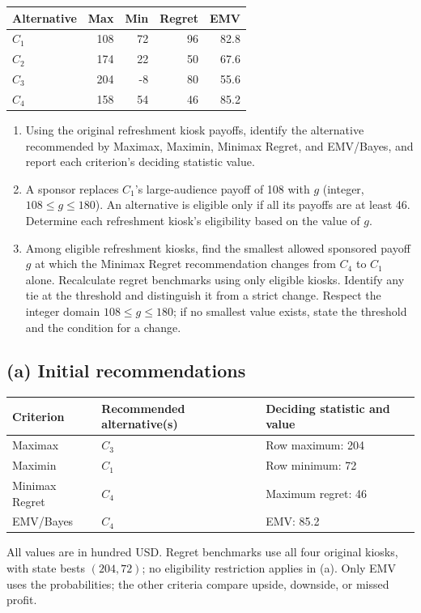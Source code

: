 \begin{center}\small\setlength{\tabcolsep}{4pt}
	\begin{tabular}{lrrrr}\toprule
		Alternative & Max & Min & Regret & EMV\\ \midrule
				$C_1$ & 108 & 72 & 96 & 82.8\\
		$C_2$ & 174 & 22 & 50 & 67.6\\
		$C_3$ & 204 & -8 & 80 & 55.6\\
		$C_4$ & 158 & 54 & 46 & 85.2\\
		\bottomrule
	\end{tabular}
\end{center}

\begin{enumerate}[label=\textbf{(\alph*)},leftmargin=*]
	\item Using the original refreshment kiosk payoffs, identify the alternative recommended by Maximax, Maximin, Minimax Regret, and EMV/Bayes, and report each criterion's deciding statistic value. 

	\item A sponsor replaces $C_1$'s large-audience payoff of 108 with $g$ (integer, $108\leq g\leq180$). An alternative is eligible only if all its payoffs are at least 46. Determine each refreshment kiosk's eligibility based on the value of $g$. 

	\item Among eligible refreshment kiosks, find the smallest allowed sponsored payoff $g$ at which the Minimax Regret recommendation changes from $C_4$ to $C_1$ alone. Recalculate regret benchmarks using only eligible kiosks. Identify any tie at the threshold and distinguish it from a strict change. Respect the integer domain $108\leq g\leq180$; if no smallest value exists, state the threshold and the condition for a change. 
\end{enumerate}
\label{sol:q2a}
\subsection*{(a) Initial recommendations }
\begin{center}
\begin{tabular}{lll}\toprule
Criterion & Recommended alternative(s) & Deciding statistic and value\\ \midrule
		Maximax & $C_3$ & Row maximum: 204\\
		Maximin & $C_1$ & Row minimum: 72\\
		Minimax Regret & $C_4$ & Maximum regret: 46\\
		EMV/Bayes & $C_4$ & EMV: 85.2\\
		\bottomrule\end{tabular}
\end{center}
All values are in hundred USD. Regret benchmarks use all four original kiosks, with state bests $(204,72)$; no eligibility restriction applies in (a). Only EMV uses the probabilities; the other criteria compare upside, downside, or missed profit.
\secInicio[sec:q2]



